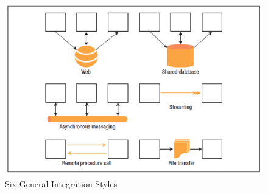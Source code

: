 \documentclass[../Main.tex]{subfiles}
\begin{document}
\begin{figure}[H]
    \centering
    \includegraphics[width=0.75\linewidth]{Images/general-integration-styles.png}
    \caption{Six General Integration Styles}
\end{figure}
\end{document}
